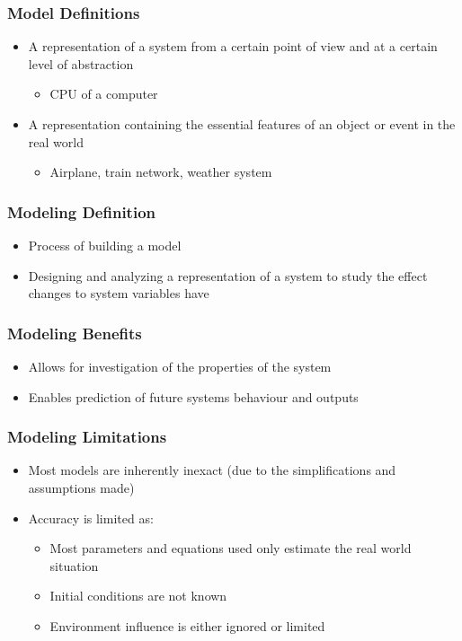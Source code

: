 \documentclass[a4paper]{article}
\begin{document}
	\subsubsection{Model Definitions}
	\begin{itemize}
		\item A representation of a system from a certain point of view
			and at a certain level of abstraction
		\begin{itemize}
			\item CPU of a computer
		\end{itemize}
		\item A representation containing the essential features of an
			object or event in the real world
		\begin{itemize}
			\item Airplane, train network, weather system
		\end{itemize}
	\end{itemize}
	\subsubsection{Modeling Definition}
	\begin{itemize}
		\item Process of building a model
		\item Designing and analyzing a representation of a system to
			study the effect changes to system variables have
	\end{itemize}

	\subsubsection{Modeling Benefits}
	\begin{itemize}
		\item Allows for investigation of the properties of the system
		\item Enables prediction of future systems behaviour and outputs
	\end{itemize}

	\subsubsection{Modeling Limitations}
	\begin{itemize}
		\item Most models are inherently inexact (due to the
			simplifications and assumptions made)
		\item Accuracy is limited as:
		\begin{itemize}
			\item Most parameters and equations used only estimate
				the real world situation
			\item Initial conditions are not known
			\item Environment influence is either ignored or limited
		\end{itemize}
	\end{itemize}
	
\end{document}
